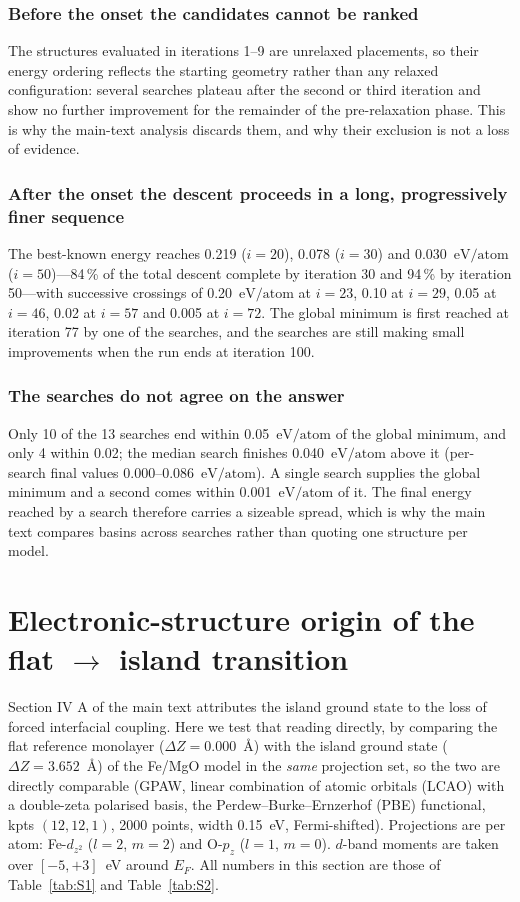 \documentclass[10pt]{article}
\newcommand{\dZ}{\ensuremath{\Delta Z}}
\newcommand{\eVA}{\ensuremath{\text{eV/atom}}}
\begin{document}
\subsubsection{Before the onset the candidates cannot be ranked} The structures evaluated in iterations
1--9 are unrelaxed placements, so their energy ordering reflects the starting geometry rather than
any relaxed configuration: several searches plateau after the second or third iteration and show no
further improvement for the remainder of the pre-relaxation phase. This is why the main-text analysis
discards them, and why their exclusion is not a loss of evidence.

\subsubsection{After the onset the descent proceeds in a long, progressively finer sequence} The
best-known energy reaches 0.219 ($i = 20$), 0.078 ($i = 30$) and 0.030~\eVA{} ($i = 50$)---84\,\% of
the total descent complete by iteration 30 and 94\,\% by iteration 50---with successive crossings of
0.20~\eVA{} at $i = 23$, 0.10 at $i = 29$, 0.05 at $i = 46$, 0.02 at $i = 57$ and 0.005 at $i = 72$.
The global minimum is first reached at iteration 77 by one of the searches, and the searches are
still making small improvements when the run ends at iteration 100.

\subsubsection{The searches do not agree on the answer} Only 10 of the 13 searches end within 0.05~\eVA{}
of the global minimum, and only 4 within 0.02; the median search finishes 0.040~\eVA{} above it
(per-search final values 0.000--0.086~\eVA). A single search supplies the global minimum and a second
comes within 0.001~\eVA{} of it. The final energy reached by a search therefore carries a sizeable
spread, which is why the main text compares basins across searches rather than quoting one structure
per model.

\section{Electronic-structure origin of the flat $\to$ island transition}
\label{sec:S2}

Section IV A of the main text attributes the island ground state to the loss of forced interfacial
coupling. Here we test that reading directly, by comparing the flat reference monolayer
($\dZ = 0.000$~\AA) with the island ground state ($\dZ = 3.652$~\AA) of the Fe/MgO model in
the \emph{same} projection set, so the two are directly comparable (GPAW, linear combination of
atomic orbitals (LCAO) with a double-zeta polarised basis, the Perdew--Burke--Ernzerhof (PBE)
functional, kpts $(12,12,1)$, 2000 points, width 0.15~eV, Fermi-shifted). Projections are per atom: Fe-$d_{z^2}$
($l = 2$, $m = 2$) and O-$p_z$ ($l = 1$, $m = 0$). $d$-band moments are taken over $[-5, +3]$~eV
around $E_F$. All numbers in this section are those of Table~\ref{tab:S1} and Table~\ref{tab:S2}.
\end{document}
